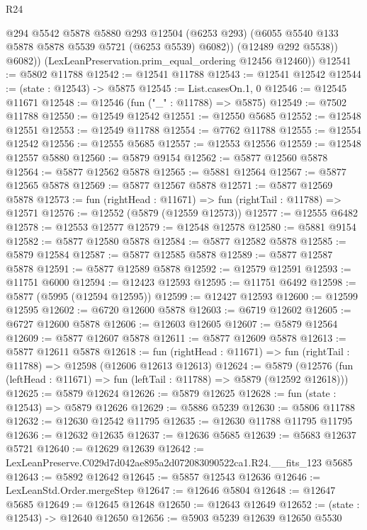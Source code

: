 \begin{lexlean}{R24}
\begin{coremodule}
              @294
              @5542
              @5878
              @5880
              @293
              @12504
              (@6253 @293)
              (@6055 @5540 @133 @5878 @5878 @5539 @5721 (@6253 @5539) @6082))
            (@12489 @292 @5538))
          @6082))
      (LexLeanPreservation.prim_equal_ordering @12456 @12460))
@12541 := @5802 @11788
@12542 := @12541 @11788
@12543 := @12541 @12542
@12544 := (state : @12543) -> @5875
@12545 := List.casesOn.{1, 0}
@12546 := @12545 @11671
@12548 := @12546 (fun ("_" : @11788) => @5875)
@12549 := @7502 @11788
@12550 := @12549 @12542
@12551 := @12550 @5685
@12552 := @12548 @12551
@12553 := @12549 @11788
@12554 := @7762 @11788
@12555 := @12554 @12542
@12556 := @12555 @5685
@12557 := @12553 @12556
@12559 := @12548 @12557 @5880
@12560 := @5879 @9154
@12562 := @5877 @12560 @5878
@12564 := @5877 @12562 @5878
@12565 := @5881 @12564
@12567 := @5877 @12565 @5878
@12569 := @5877 @12567 @5878
@12571 := @5877 @12569 @5878
@12573 := fun (rightHead : @11671) => fun (rightTail : @11788) => @12571
@12576 := @12552 (@5879 (@12559 @12573))
@12577 := @12555 @6482
@12578 := @12553 @12577
@12579 := @12548 @12578
@12580 := @5881 @9154
@12582 := @5877 @12580 @5878
@12584 := @5877 @12582 @5878
@12585 := @5879 @12584
@12587 := @5877 @12585 @5878
@12589 := @5877 @12587 @5878
@12591 := @5877 @12589 @5878
@12592 := @12579 @12591
@12593 := @11751 @6000
@12594 := @12423 @12593
@12595 := @11751 @6492
@12598 := @5877 (@5995 (@12594 @12595))
@12599 := @12427 @12593
@12600 := @12599 @12595
@12602 := @6720 @12600 @5878
@12603 := @6719 @12602
@12605 := @6727 @12600 @5878
@12606 := @12603 @12605
@12607 := @5879 @12564
@12609 := @5877 @12607 @5878
@12611 := @5877 @12609 @5878
@12613 := @5877 @12611 @5878
@12618 := fun (rightHead : @11671) => fun (rightTail : @11788) => @12598 (@12606 @12613 @12613)
@12624 := @5879
    (@12576 (fun (leftHead : @11671) => fun (leftTail : @11788) => @5879 (@12592 @12618)))
@12625 := @5879 @12624
@12626 := @5879 @12625
@12628 := fun (state : @12543) => @5879 @12626
@12629 := @5886 @5239
@12630 := @5806 @11788
@12632 := @12630 @12542 @11795
@12635 := @12630 @11788 @11795 @11795
@12636 := @12632 @12635
@12637 := @12636 @5685
@12639 := @5683 @12637 @5721
@12640 := @12629 @12639
@12642 := LexLeanPreserve.C029d7d042ae895a2d072083090522ca1.R24.__fits_123 @5685
@12643 := @5892 @12642
@12645 := @5857 @12543 @12636
@12646 := LexLeanStd.Order.mergeStep
@12647 := @12646 @5804
@12648 := @12647 @5685
@12649 := @12645 @12648
@12650 := @12643 @12649
@12652 := (state : @12543) -> @12640 @12650
@12656 := @5903 @5239 @12639 @12650 @5530

\end{coremodule}
\end{lexlean}
